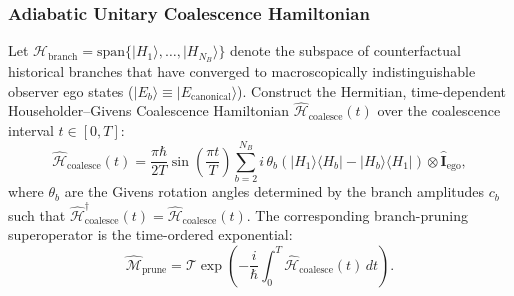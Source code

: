 \documentclass[11pt,onecolumn]{article}
\begin{document}
\subsubsection{Adiabatic Unitary Coalescence Hamiltonian}
Let $\mathcal{H}_{\mathrm{branch}} = \mathrm{span}\{|H_1\rangle, \dots, |H_{N_B}\rangle\}$ denote the subspace of counterfactual historical branches that have converged to macroscopically indistinguishable observer ego states ($|E_b\rangle \equiv |E_{\mathrm{canonical}}\rangle$). Construct the Hermitian, time-dependent Householder--Givens Coalescence Hamiltonian $\hat{\mathcal{H}}_{\mathrm{coalesce}}(t)$ over the coalescence interval $t \in [0, T]$:
\begin{equation}
\hat{\mathcal{H}}_{\mathrm{coalesce}}(t) = \frac{\pi\hbar}{2T}\sin\left(\frac{\pi t}{T}\right) \sum_{b=2}^{N_B} i\,\theta_b \left( |H_1\rangle\langle H_b| - |H_b\rangle\langle H_1| \right) \otimes \hat{\mathbf{I}}_{\mathrm{ego}},
\end{equation}
where $\theta_b$ are the Givens rotation angles determined by the branch amplitudes $c_b$ such that $\hat{\mathcal{H}}_{\mathrm{coalesce}}^\dagger(t) = \hat{\mathcal{H}}_{\mathrm{coalesce}}(t)$. The corresponding branch-pruning superoperator is the time-ordered exponential:
\begin{equation}
\hat{\mathcal{M}}_{\mathrm{prune}} = \mathcal{T}\exp\left( -\frac{i}{\hbar}\int_0^T \hat{\mathcal{H}}_{\mathrm{coalesce}}(t)\,dt \right).
\label{eq:m_prune_unitary}
\end{equation}
\end{document}
